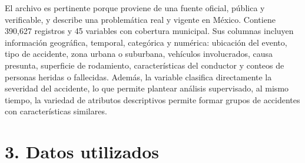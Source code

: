 \documentclass[11pt,letterpaper]{article}
\begin{document}
\begin{nota}
El archivo  es pertinente porque proviene de una fuente
oficial, pública y verificable, y describe una problemática real y vigente en
México. Contiene 390,627 registros y 45 variables con cobertura municipal. Sus
columnas incluyen información geográfica, temporal, categórica y numérica:
ubicación del evento, tipo de accidente, zona urbana o suburbana, vehículos
involucrados, causa presunta, superficie de rodamiento, características del
conductor y conteos de personas heridas o fallecidas. Además, la variable
 clasifica directamente la severidad del accidente, lo que permite
plantear análisis supervisado, al mismo tiempo, la variedad de atributos
descriptivos permite formar grupos de accidentes con características similares.
\end{nota}


\section*{3. Datos utilizados}
\end{document}
